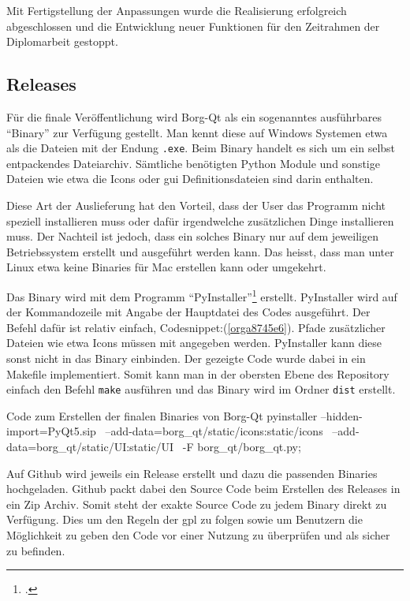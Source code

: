 Mit Fertigstellung der Anpassungen wurde die Realisierung erfolgreich
abgeschlossen und die Entwicklung neuer Funktionen für den Zeitrahmen der
Diplomarbeit gestoppt.

\subsection{Releases}
\label{sec:org3adb3b3}

Für die finale Veröffentlichung wird Borg-Qt als ein sogenanntes ausführbares
"`Binary"' zur Verfügung gestellt. Man kennt diese auf Windows Systemen etwa als
die Dateien mit der Endung \texttt{.exe}. Beim Binary handelt es sich um ein selbst
entpackendes Dateiarchiv. Sämtliche benötigten Python Module und sonstige
Dateien wie etwa die Icons oder \gls{gui} Definitionsdateien sind darin
enthalten.

Diese Art der Auslieferung hat den Vorteil, dass der User das Programm nicht
speziell installieren muss oder dafür irgendwelche zusätzlichen Dinge
installieren muss. Der Nachteil ist jedoch, dass ein solches Binary nur auf dem
jeweiligen Betriebssystem erstellt und ausgeführt werden kann. Das heisst, dass
man unter Linux etwa keine Binaries für Mac erstellen kann oder umgekehrt.

Das Binary wird mit dem Programm "`PyInstaller"'\footcite{pyinstaller} erstellt.
PyInstaller wird auf der Kommandozeile mit Angabe der Hauptdatei des Codes
ausgeführt. Der Befehl dafür ist relativ einfach,
Codesnippet:(\ref{orga8745e6}). Pfade zusätzlicher Dateien wie etwa Icons
müssen mit angegeben werden. PyInstaller kann diese sonst nicht in das Binary
einbinden. Der gezeigte Code wurde dabei in ein Makefile implementiert. Somit
kann man in der obersten Ebene des Repository einfach den Befehl \texttt{make}
ausführen und das Binary wird im Ordner \texttt{dist} erstellt.

\begin{sexylisting}{Code zum Erstellen der finalen Binaries von Borg-Qt}
pyinstaller --hidden-import=PyQt5.sip \
    --add-data=borg_qt/static/icons:static/icons \
    --add-data=borg_qt/static/UI:static/UI \
    -F borg_qt/borg_qt.py; \
\end{sexylisting}

Auf Github wird jeweils ein Release erstellt und dazu die passenden Binaries
hochgeladen. Github packt dabei den Source Code beim Erstellen des Releases in
ein Zip Archiv. Somit steht der exakte Source Code zu jedem Binary direkt zu
Verfügung. Dies um den Regeln der \gls{gpl} zu folgen sowie um Benutzern die
Möglichkeit zu geben den Code vor einer Nutzung zu überprüfen und als sicher zu
befinden.


